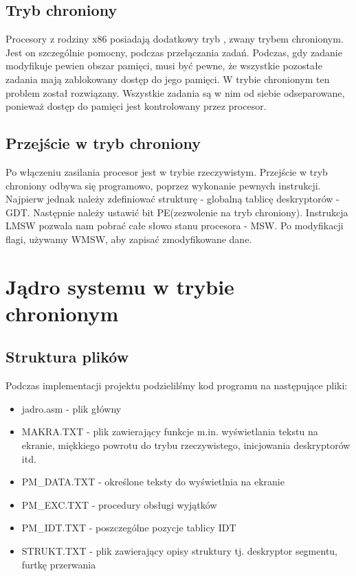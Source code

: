 \documentclass[a4paper,12pt]{article}
\begin{document}
	
	
	\subsection{Tryb chroniony}
	Procesory z rodziny x86  posiadają dodatkowy tryb , zwany trybem chronionym. Jest on szczególnie pomocny, podczas przełączania zadań. Podczas, gdy zadanie modyfikuje pewien obszar pamięci, musi być pewne, że wszystkie pozostałe zadania mają zablokowany dostęp do jego pamięci. W trybie chronionym ten problem został rozwiązany. Wszystkie zadania są w nim od siebie odseparowane, ponieważ dostęp do pamięci jest kontrolowany przez procesor. 

	\subsection{Przejście w tryb chroniony}
	Po włączeniu zasilania procesor jest w trybie rzeczywistym. Przejście w tryb chroniony odbywa się programowo, poprzez wykonanie pewnych instrukcji. Najpierw jednak należy zdefiniować strukturę - globalną tablicę deskryptorów - GDT.  Następnie należy ustawić bit PE(zezwolenie na tryb chroniony). Instrukcja LMSW pozwala nam pobrać całe słowo stanu procesora -  MSW. Po modyfikacji flagi, używamy WMSW, aby zapisać zmodyfikowane dane.
	
	\section{Jądro systemu w trybie chronionym}
	\subsection{Struktura plików}
		Podczas implementacji projektu podzielilśmy kod programu na następujące pliki:
		\begin{itemize}
			\item{jadro.asm - plik główny}
			\item{MAKRA.TXT - plik zawierający funkcje m.in. wyświetlania tekstu na ekranie, miękkiego powrotu do trybu rzeczywistego, inicjowania deskryptorów itd.  }
			\item{PM\_DATA.TXT - określone teksty do wyświetlnia na ekranie}
			\item{PM\_EXC.TXT - procedury obsługi wyjątków}
			\item{PM\_IDT.TXT - poszczególne pozycje tablicy IDT}
			\item{STRUKT.TXT - plik zawierający opisy struktury tj. deskryptor segmentu, furtkę przerwania}
		\end{itemize}
\end{document}
